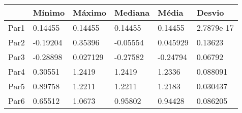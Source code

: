 \begin{tabular}{llllll}
& Mínimo & Máximo & Mediana & Média & Desvio \\ 
\hline 
Par1 & 0.14455 & 0.14455 & 0.14455 & 0.14455 & 2.7879e-17 \\ 
Par2 & -0.19204 & 0.35396 & -0.05554 & 0.045929 & 0.13623 \\ 
Par3 & -0.28898 & 0.027129 & -0.27582 & -0.24794 & 0.06792 \\ 
Par4 & 0.30551 & 1.2419 & 1.2419 & 1.2336 & 0.088091 \\ 
Par5 & 0.89758 & 1.2211 & 1.2211 & 1.2183 & 0.030437 \\ 
Par6 & 0.65512 & 1.0673 & 0.95802 & 0.94428 & 0.086205 \\ 
\hline 
\end{tabular}